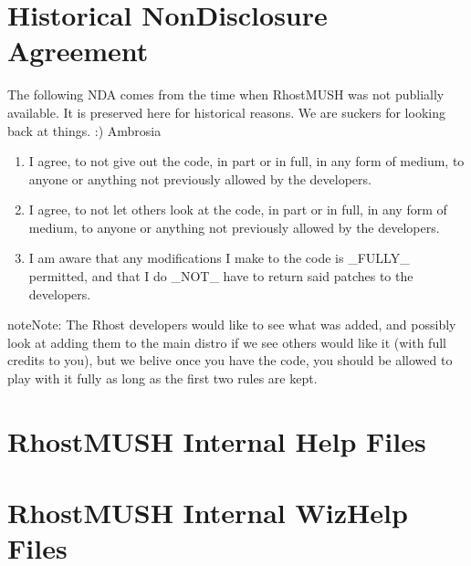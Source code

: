 \documentclass[letterpaper,10pt,english]{sphinxmanual}
\begin{document}
\chapter{Historical Non\sphinxhyphen{}Disclosure Agreement}
\label{\detokenize{nda:historical-non-disclosure-agreement}}\label{\detokenize{nda::doc}}
\sphinxAtStartPar
The following NDA comes from the time when RhostMUSH was not publially
available. It is preserved here for historical reasons. We are suckers for
looking back at things. :)
\sphinxhyphen{}\sphinxhyphen{}Ambrosia
\begin{enumerate}
%
\item {} 
\sphinxAtStartPar
I agree, to not give out the code, in part or in full, in any form of
medium, to anyone or anything not previously allowed by the developers.

\item {} 
\sphinxAtStartPar
I agree, to not let others look at the code, in part or in full, in
any form of medium, to anyone or anything not previously allowed by the
developers.

\item {} 
\sphinxAtStartPar
I am aware that any modifications I make to the code is \_FULLY\_
permitted, and that I do \_NOT\_ have to return said patches to the
developers.

\end{enumerate}

\begin{sphinxadmonition}{note}{Note:}
\sphinxAtStartPar
The Rhost developers would like to see what was added, and possibly
look at adding them to the main distro if we see others would like
it (with full credits to you), but we belive once you have the code,
you should be allowed to play with it fully as long as the first two
rules are kept.
\end{sphinxadmonition}


\chapter{RhostMUSH Internal Help Files}
\label{\detokenize{help:rhostmush-internal-help-files}}\label{\detokenize{help::doc}}



\chapter{RhostMUSH Internal WizHelp Files}
\label{\detokenize{wizhelp:rhostmush-internal-wizhelp-files}}\label{\detokenize{wizhelp::doc}}
\end{document}
